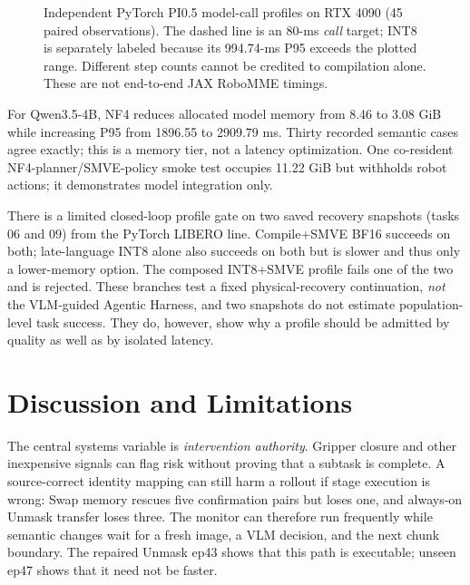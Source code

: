 \documentclass[letterpaper,10pt,conference]{ieeeconf}
\begin{document}
\begin{figure}[t]
\centering
\resizebox{0.96\columnwidth}{!}{}
\caption{Independent PyTorch PI0.5 model-call profiles on RTX 4090 (45 paired observations). The dashed line is an 80-ms \emph{call} target; INT8 is separately labeled because its 994.74-ms P95 exceeds the plotted range. Different step counts cannot be credited to compilation alone. These are not end-to-end JAX RoboMME timings.}
\label{fig:runtime}
\end{figure}

For Qwen3.5-4B, NF4 reduces allocated model memory from 8.46 to 3.08 GiB while increasing P95 from 1896.55 to 2909.79 ms. Thirty recorded semantic cases agree exactly; this is a memory tier, not a latency optimization. One co-resident NF4-planner/SMVE-policy smoke test occupies 11.22 GiB but withholds robot actions; it demonstrates model integration only.

There is a limited closed-loop profile gate on two saved recovery snapshots (tasks 06 and 09) from the PyTorch LIBERO line. Compile+SMVE BF16 succeeds on both; late-language INT8 alone also succeeds on both but is slower and thus only a lower-memory option. The composed INT8+SMVE profile fails one of the two and is rejected. These branches test a fixed physical-recovery continuation, \emph{not} the VLM-guided Agentic Harness, and two snapshots do not estimate population-level task success. They do, however, show why a profile should be admitted by quality as well as by isolated latency.

\section{Discussion and Limitations}
The central systems variable is \emph{intervention authority}. Gripper
closure and other inexpensive signals can flag risk without proving that a
subtask is complete. A source-correct identity mapping can still harm a
rollout if stage execution is wrong: Swap memory rescues five confirmation
pairs but loses one, and always-on Unmask transfer loses three. The monitor
can therefore run frequently while semantic changes wait for a fresh image,
a VLM decision, and the next chunk boundary. The repaired Unmask ep43 shows
that this path is executable; unseen ep47 shows that it need not be faster.
\end{document}
